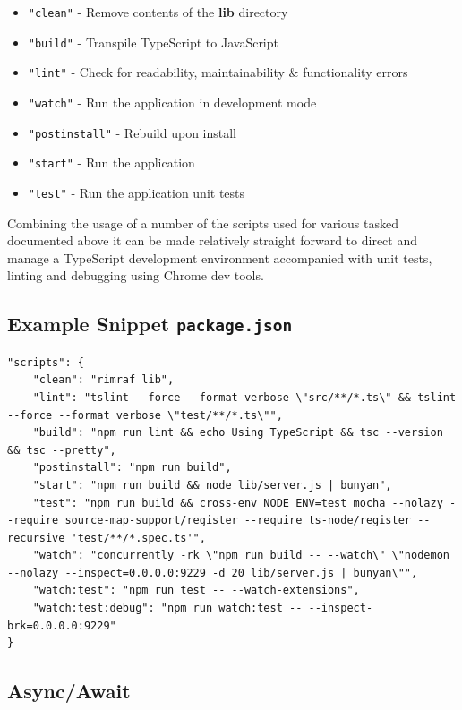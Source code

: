 \begin{itemize}
\item{\texttt{"clean"} - Remove contents of the \textbf{lib} directory}
\item{\texttt{"build"} - Transpile TypeScript to JavaScript}
\item{\texttt{"lint"} - Check for readability, maintainability \& functionality errors}
\item{\texttt{"watch"} - Run the application in development mode}
\item{\texttt{"postinstall"} - Rebuild upon install}
\item{\texttt{"start"} - Run the application}
\item{\texttt{"test"} - Run the application unit tests}
\end{itemize}

Combining the usage of a number of the scripts used for various tasked documented above it can be made relatively straight forward to direct and manage a TypeScript development environment accompanied with unit tests, linting and debugging using Chrome dev tools\cite{nodedebug}. 

\subsection*{Example Snippet \texttt{package.json } }

\begin{verbatim}
"scripts": {
    "clean": "rimraf lib",
    "lint": "tslint --force --format verbose \"src/**/*.ts\" && tslint --force --format verbose \"test/**/*.ts\"",
    "build": "npm run lint && echo Using TypeScript && tsc --version && tsc --pretty",
    "postinstall": "npm run build",
    "start": "npm run build && node lib/server.js | bunyan",
    "test": "npm run build && cross-env NODE_ENV=test mocha --nolazy --require source-map-support/register --require ts-node/register --recursive 'test/**/*.spec.ts'",
    "watch": "concurrently -rk \"npm run build -- --watch\" \"nodemon --nolazy --inspect=0.0.0.0:9229 -d 20 lib/server.js | bunyan\"",
    "watch:test": "npm run test -- --watch-extensions",
    "watch:test:debug": "npm run watch:test -- --inspect-brk=0.0.0.0:9229"
}
\end{verbatim}

\subsection{Async/Await}

